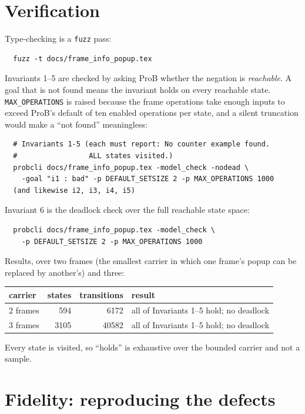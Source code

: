 \documentclass[a4paper,10pt,fleqn]{article}
\begin{document}
\section{Verification}
\label{sec:verify}

Type-checking is a \texttt{fuzz} pass:
\begin{verbatim}
  fuzz -t docs/frame_info_popup.tex
\end{verbatim}

Invariants 1--5 are checked by asking ProB whether the negation is
\emph{reachable}.  A goal that is not found means the invariant holds on every
reachable state.  \texttt{MAX\_OPERATIONS} is raised because the frame
operations take enough inputs to exceed ProB's default of ten enabled
operations per state, and a silent truncation would make a ``not found''
meaningless:
\begin{verbatim}
  # Invariants 1-5 (each must report: No counter example found.
  #                 ALL states visited.)
  probcli docs/frame_info_popup.tex -model_check -nodead \
    -goal "i1 : bad" -p DEFAULT_SETSIZE 2 -p MAX_OPERATIONS 1000
  (and likewise i2, i3, i4, i5)
\end{verbatim}

Invariant 6 is the deadlock check over the full reachable state space:
\begin{verbatim}
  probcli docs/frame_info_popup.tex -model_check \
    -p DEFAULT_SETSIZE 2 -p MAX_OPERATIONS 1000
\end{verbatim}

Results, over two frames (the smallest carrier in which one frame's popup can
be replaced by another's) and three:
\begin{center}
\begin{tabular}{lrrl}
  carrier & states & transitions & result \\ \hline
  2 frames & 594 & 6172 & all of Invariants 1--5 hold; no deadlock \\
  3 frames & 3105 & 40582 & all of Invariants 1--5 hold; no deadlock \\
\end{tabular}
\end{center}
Every state is visited, so ``holds'' is exhaustive over the bounded carrier and
not a sample.

\section{Fidelity: reproducing the defects}
\label{sec:fidelity}
\end{document}
